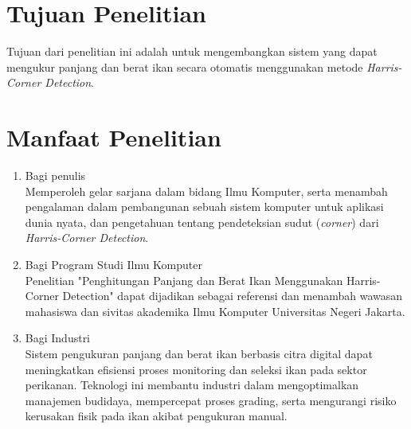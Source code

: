 \section{Tujuan Penelitian}
Tujuan dari penelitian ini adalah untuk mengembangkan sistem yang dapat mengukur panjang dan berat ikan secara otomatis menggunakan metode \emph{Harris-Corner Detection}.

\section{Manfaat Penelitian}
\begin{enumerate}
    \item Bagi penulis\\
    Memperoleh gelar sarjana dalam bidang Ilmu Komputer, serta menambah pengalaman dalam pembangunan sebuah sistem komputer untuk aplikasi dunia nyata, dan pengetahuan tentang pendeteksian sudut (\emph{corner}) dari \emph{Harris-Corner Detection}.
    
    \item Bagi Program Studi Ilmu Komputer\\
    Penelitian "Penghitungan Panjang dan Berat Ikan Menggunakan Harris-Corner Detection" dapat dijadikan sebagai referensi dan menambah wawasan mahasiswa dan sivitas akademika Ilmu Komputer Universitas Negeri Jakarta.

    \item Bagi Industri\\
    Sistem pengukuran panjang dan berat ikan berbasis citra digital dapat meningkatkan efisiensi proses monitoring dan seleksi ikan pada sektor perikanan. Teknologi ini membantu industri dalam mengoptimalkan manajemen budidaya, mempercepat proses grading, serta mengurangi risiko kerusakan fisik pada ikan akibat pengukuran manual.
\end{enumerate}

\begin{comment}

\end{comment}
